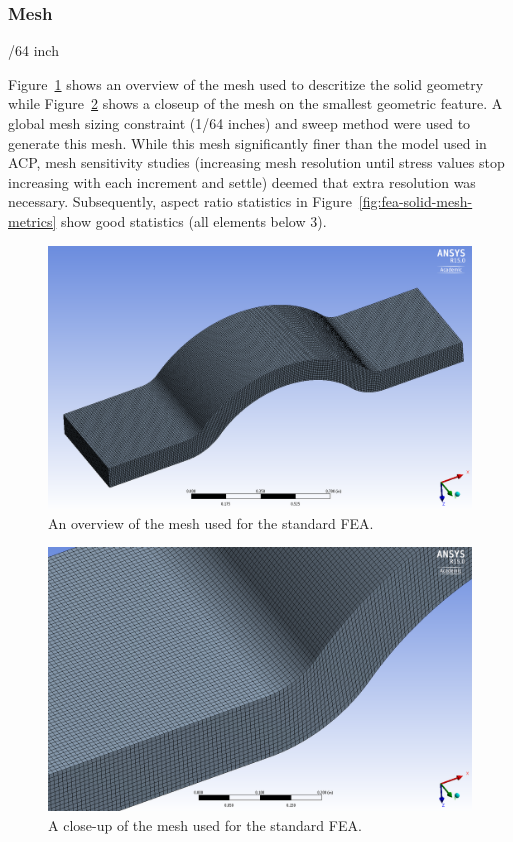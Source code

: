 \clearpage

\subsubsection{Mesh}

/64 inch

Figure~\ref{fig:fea-solid-mesh-overview} shows an overview of the mesh used to descritize the solid geometry while Figure~\ref{fig:fea-solid-mesh-closeup} shows a closeup of the mesh on the smallest geometric feature. A global mesh sizing constraint (1/64 inches) and sweep method were used to generate this mesh. While this mesh significantly finer than the model used in ACP, mesh sensitivity studies (increasing mesh resolution until stress values stop increasing with each increment and settle) deemed that extra resolution was necessary. Subsequently, aspect ratio statistics in Figure~\ref{fig:fea-solid-mesh-metrics} show good statistics (all elements below 3).\\

\begin{figure}[htp]
\centering
\includegraphics[width=1\textwidth]{./figures/fea/fea-solid-mesh-overview}
\caption{An overview of the mesh used for the standard FEA.}
\label{fig:fea-solid-mesh-overview}
\end{figure}

\begin{figure}[htp]
\centering
\includegraphics[width=1\textwidth]{./figures/fea/fea-solid-mesh-closeup}
\caption{A close-up of the mesh used for the standard FEA.}
\label{fig:fea-solid-mesh-closeup}
\end{figure}

